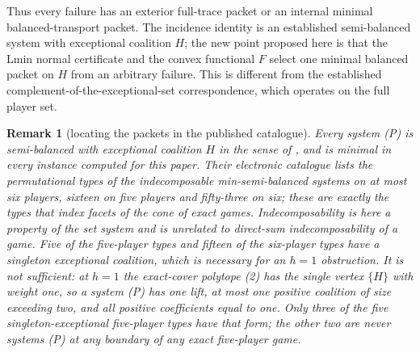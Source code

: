 \documentclass[11pt]{article}
\newtheorem{remark}[theorem]{Remark}
\begin{document}
Thus every failure has an exterior full-trace packet or an internal minimal
balanced-transport packet.  The incidence identity is an established
semi-balanced system with exceptional coalition $H$; the new point proposed
here is that the Lmin normal certificate and the convex functional $F$
select one minimal balanced packet on $H$ from an arbitrary failure.  This is
different from the established complement-of-the-exceptional-set
correspondence, which operates on the full player set.

\begin{remark}[locating the packets in the published catalogue]
\label{rem:catalogue}
Every system (P) is semi-balanced with exceptional coalition $H$ in the sense
of \citet{StudenyKratochvil2022}, and is minimal in every instance computed
for this paper.  Their electronic catalogue lists the permutational types of the
\emph{indecomposable} min-semi-balanced systems on at most six players,
sixteen on five players and fifty-three on six; these are exactly the types
that index facets of the cone of exact games.  Indecomposability is here a
property of the set system and is unrelated to direct-sum indecomposability
of a game.  Five of the five-player types and fifteen of the six-player types
have a singleton exceptional coalition, which is necessary for an $h=1$
obstruction.  It is not sufficient: at $h=1$ the exact-cover polytope (2) has
the single vertex $\{H\}$ with weight one, so a system (P) has one lift, at
most one positive coalition of size exceeding two, and all positive
coefficients equal to one.  Only three of the five singleton-exceptional
five-player types have that form; the other two are never systems (P) at any
boundary of any exact five-player game.


\end{remark}
\end{document}
